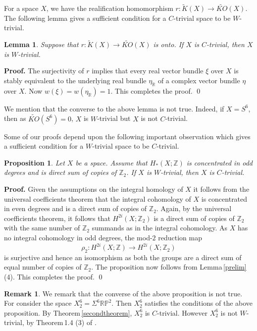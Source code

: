 \documentclass[12pt,reqno]{amsart}
\numberwithin{equation}{subsection}
\newtheorem{Lem}[subsection]{Lemma}
\newtheorem{Prop}[subsection]{Proposition}
\theoremstyle{definition}
\newtheorem{Rem}[subsection]{Remark}
\begin{document}
For a space $X$, we have the realification homomorphism $r:\widetilde{K}(X)\longrightarrow \widetilde{KO}(X)$. 
The following lemma gives a sufficient condition for a $C$-trivial space to be $W$-trivial. 
 
\begin{Lem}
Suppose that $r:\widetilde{K}(X)\longrightarrow \widetilde{KO}(X)$ is onto. If $X$ is $C$-trivial, then $X$ is $W$-trivial. 
\end{Lem}
{\bf Proof.} The surjectivity of $r$ implies that every real vector bundle $\xi$ over $X$ is stably equivalent to the underlying real bundle 
$\eta_{\mathbb R}$ of a complex vector bundle $\eta$ over $X$. Now $w(\xi) =w(\eta_{\mathbb R})=1$. This completes the proof. \qed

We mention that the converse to the above lemma is not true. Indeed, if $X=S^6$, then as $\widetilde{KO}(S^6)=0$, $X$ is $W$-trivial but $X$ is not 
$C$-trivial. 

Some of our proofs depend upon the following important observation which gives 
a sufficient condition for a $W$-trivial space to be $C$-trivial. 

\begin{Prop}\label{onetytwo}
Let $X$ be a space. Assume that $H_*(X;\mathbb Z)$ is concentrated in odd degrees and is direct sum of copies of $\mathbb Z _2$. If $X$ is $W$-trivial, then $X$ is $C$-trivial. 
\end{Prop}
{\bf Proof.} Given the assumptions on the integral homology of $X$ it follows from the universal coefficients theorem that the integral cohomology of $X$ is concentrated in even degrees and is a direct sum of copies of $\mathbb Z_2$. Again, by the universal coefficients theorem, it follows that $H^{2i}(X;\mathbb Z_2)$ is a direct sum of copies of $\mathbb Z_2$ with the same number of $\mathbb Z_2$ summands as in the integral cohomology. 
As $X$ has no integral cohomology in odd degrees, the mod-$2$ reduction map 
$$\rho_2:H^{2i}(X;\mathbb Z)\longrightarrow H^{2i}(X;\mathbb Z_2)$$
is surjective and hence an isomorphism as both the groups are a direct sum of equal number of copies of $\mathbb Z_2$. The proposition now follows from Lemma\,\ref{prelim} (4). This completes the proof. \qed

\begin{Rem}
We remark that the converse of the above proposition is not true. For consider the space $X^6_2=\Sigma^6\mathbb R\mathbb P^2$. Then $X^6_2$ satisfies the conditions of the above proposition. By Theorem\,\ref{secondtheorem}, $X^6_2$ is $C$-trivial. However $X^6_2$ is not $W$-trivial, by Theorem\,1.4 (3) of \cite{tanaka}. 
\end{Rem}
\end{document}

